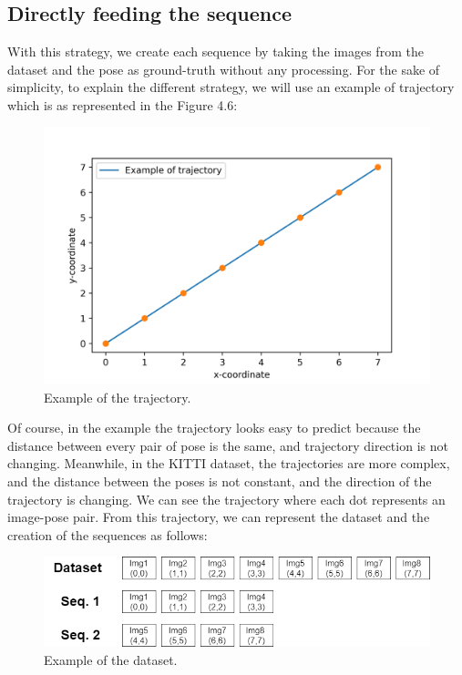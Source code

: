 \subsection{Directly feeding the sequence}\label{subsec:directly-feeding-the-sequence}
With this strategy, we create each sequence by taking the images from the dataset and the pose as ground-truth without any processing.
For the sake of simplicity, to explain the different strategy, we will use an example of trajectory which is as represented in the Figure 4.6:
\begin{figure}[H]
    \centering
    \includegraphics[width=\textwidth]{images/4_2_example_of_trajectory}
    \caption{Example of the trajectory.}
    \label{fig:example-of-trajectory}
\end{figure}
Of course, in the example the trajectory looks easy to predict because the distance between every pair of pose is the same, and trajectory direction is not changing.
Meanwhile, in the KITTI dataset, the trajectories are more complex, and the distance between the poses is not constant, and the direction of the trajectory is changing.
We can see the trajectory where each dot represents an image-pose pair.
From this trajectory, we can represent the dataset and  the creation of the sequences as follows:
\begin{figure}[H]
    \centering
    \includegraphics[width=\textwidth]{images/4_2_directly_feeding}
    \caption{Example of the dataset.}
    \label{fig:example-of-dataset}
\end{figure}
